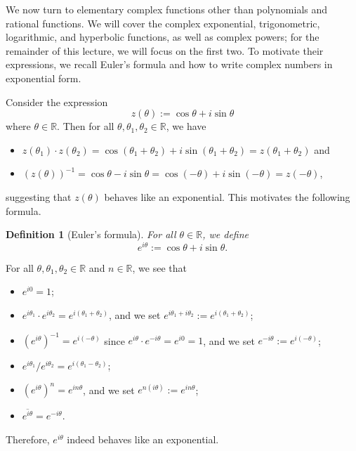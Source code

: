 \documentclass[10pt]{article}
\newcommand{\R}{\mathbb{R}}
\theoremstyle{newstyle}
\newtheorem{defn}[thm]{Definition}
\begin{document}
We now turn to elementary complex functions other than polynomials and rational functions. 
We will cover the complex exponential, trigonometric, logarithmic, and hyperbolic functions, 
as well as complex powers; for the remainder of this lecture, we will focus on the first two. 
To motivate their expressions, we recall Euler's formula and how to write complex numbers in 
exponential form. 

Consider the expression 
\[ z(\theta) := \cos\theta + i\sin\theta \]
where $\theta \in \R$. Then for all $\theta, \theta_1, \theta_2 \in \R$, we have 
\begin{itemize}
    \item $z(\theta_1) \cdot z(\theta_2) = \cos(\theta_1 + \theta_2) + i\sin(\theta_1 + \theta_2) 
    = z(\theta_1 + \theta_2)$ and
    \item $(z(\theta))^{-1} = \cos\theta - i\sin\theta = \cos(-\theta) + i\sin(-\theta) = z(-\theta)$,
\end{itemize}
suggesting that $z(\theta)$ behaves like an exponential. This motivates the following formula. 

\begin{defn}[Euler's formula]
For all $\theta \in \R$, we define 
\[ e^{i\theta} := \cos\theta + i\sin\theta. \]
\end{defn}
For all $\theta, \theta_1, \theta_2 \in \R$ and $n \in \R$, we see that 
\begin{itemize}
    \item $e^{i0} = 1$;
    \item $e^{i\theta_1} \cdot e^{i\theta_2} = e^{i(\theta_1+\theta_2)}$, and we set 
    $e^{i\theta_1 + i\theta_2} := e^{i(\theta_1+\theta_2)}$;
    \item $(e^{i\theta})^{-1} = e^{i(-\theta)}$ since $e^{i\theta} \cdot e^{-i\theta} = e^{i0} = 1$, 
    and we set $e^{-i\theta} := e^{i(-\theta)}$;
    \item $e^{i\theta_1}/e^{i\theta_2} = e^{i(\theta_1 - \theta_2)}$;
    \item $(e^{i\theta})^n = e^{in\theta}$, and we set $e^{n(i\theta)} := e^{in\theta}$;
    \item $\overline{e^{i\theta}} = e^{-i\theta}$.
\end{itemize}
Therefore, $e^{i\theta}$ indeed behaves like an exponential. 
\end{document}
